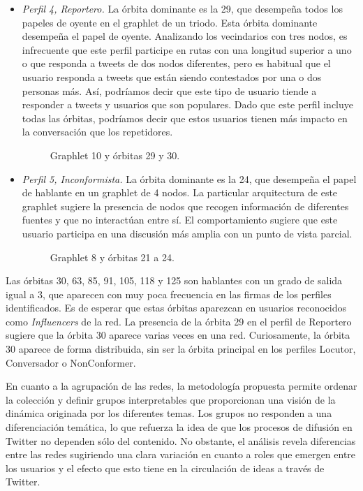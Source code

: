 \begin{itemize}
\item \emph{Perfil 4, Reportero.} La órbita dominante es la 29, que desempeña todos los papeles de oyente en el graphlet de un triodo. Esta órbita dominante desempeña el papel de oyente. Analizando los vecindarios con tres nodos, es infrecuente que este perfil participe en rutas con una longitud superior a uno o que responda a tweets de dos nodos diferentes, pero es habitual que el usuario responda a tweets que están siendo contestados por una o dos personas más. Así, podríamos decir que este tipo de usuario tiende a responder a tweets y usuarios que son populares. Dado que este perfil incluye todas las órbitas, podríamos decir que estos usuarios tienen más impacto en la conversación que los repetidores. \begin{figure}[htbp]
   \centering
   
    \caption{Graphlet 10 y órbitas 29 y 30.}
    \label{img:web-comp}
\end{figure}

\item \emph{Perfil 5, Inconformista.} La órbita dominante es la 24, que desempeña el papel de hablante en un graphlet de 4 nodos. La particular arquitectura de este graphlet sugiere la presencia de nodos que recogen información de diferentes fuentes y que no interactúan entre sí. El comportamiento sugiere que este usuario participa en una discusión más amplia con un punto de vista parcial. \begin{figure}[htbp]
   \centering
   
    \caption{Graphlet 8 y órbitas 21 a 24.}
    \label{img:web-comp}
\end{figure}

\end{itemize}

Las órbitas 30, 63, 85, 91, 105, 118 y 125 son hablantes con un grado de salida igual a 3, que aparecen con muy poca frecuencia en las firmas de los perfiles identificados. Es de esperar que estas órbitas aparezcan en usuarios reconocidos como \textit{Influencers} de la red. La presencia de la órbita 29 en el perfil de Reportero sugiere que la órbita 30 aparece varias veces en una red. Curiosamente, la órbita 30 aparece de forma distribuida, sin ser la órbita principal en los perfiles Locutor, Conversador o NonConformer.

En cuanto a la agrupación de las redes, la metodología propuesta permite ordenar la colección y definir grupos interpretables que proporcionan una visión de la dinámica originada por los diferentes temas. Los grupos no responden a una diferenciación temática, lo que refuerza la idea de que los procesos de difusión en Twitter no dependen sólo del contenido. No obstante, el análisis revela diferencias entre las redes sugiriendo una clara variación en cuanto a roles que emergen entre los usuarios y el efecto que esto tiene en la circulación de ideas a través de Twitter. 

